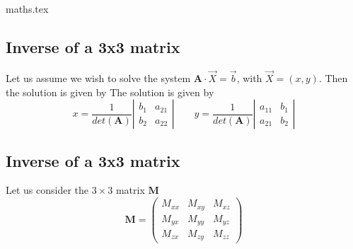 \begin{flushright} {\tiny {\color{gray} maths.tex}} \end{flushright}

\subsection{Inverse of a 3x3 matrix \label{sec:inv2x2}}

Let us assume we wish to solve the 
system $\bm A \cdot \vec X = \vec b$, with $\vec X=(x,y)$. Then the solution is given by
The solution is given by
\[
x=\frac{1}{det(\bm A)}
\left|
\begin{array}{cc}
b_1 & a_{21} \\
b_2 & a_{22}
\end{array}
\right|
\qquad
y=\frac{1}{det(\bm A)}
\left|
\begin{array}{cc}
a_{11} & b_1\\
a_{21} & b_2
\end{array}
\right|
\]



\subsection{Inverse of a 3x3 matrix \label{sec:inv3x3}}

Let us consider the $3 \times 3$ matrix ${\bm M}$
\[
{\bm M}=
\left(
\begin{array}{ccc}
M_{xx} & M_{xy} & M_{xz} \\
M_{yx} & M_{yy} & M_{yz} \\
M_{zx} & M_{zy} & M_{zz} 
\end{array}
\right)
\]

